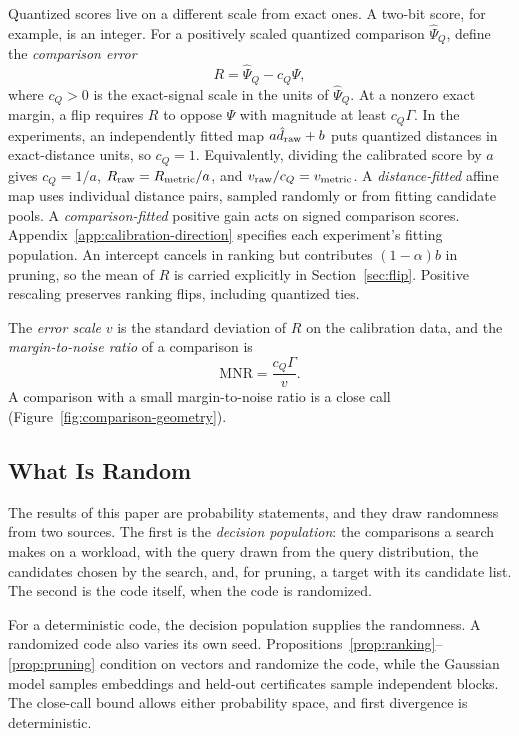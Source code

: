 \documentclass[twoside,11pt]{article}
\newcommand{\mnr}{\mathrm{MNR}}
\begin{document}
Quantized scores live on a different scale from exact ones. A two-bit score, for example, is an integer. For a positively scaled quantized comparison $\widehat\Psi_Q$, define the \emph{comparison error}
\begin{equation}
R=\widehat\Psi_Q-c_Q\Psi,
\label{eq:comparison-error}
\end{equation}
where $c_Q>0$ is the exact-signal scale in the units of $\widehat\Psi_Q$. At a nonzero exact margin, a flip requires $R$ to oppose $\Psi$ with magnitude at least $c_Q\Gamma$. In the experiments, an independently fitted map $a\hat d_{\rm raw}+b$ puts quantized distances in exact-distance units, so $c_Q=1$. Equivalently, dividing the calibrated score by $a$ gives $c_Q=1/a$, $R_{\rm raw}=R_{\rm metric}/a$, and $v_{\rm raw}/c_Q=v_{\rm metric}$. A \emph{distance-fitted} affine map uses individual distance pairs, sampled randomly or from fitting candidate pools. A \emph{comparison-fitted} positive gain acts on signed comparison scores. Appendix~\ref{app:calibration-direction} specifies each experiment's fitting population. An intercept cancels in ranking but contributes $(1-\alpha)b$ in pruning, so the mean of $R$ is carried explicitly in Section~\ref{sec:flip}. Positive rescaling preserves ranking flips, including quantized ties.

The \emph{error scale} $v$ is the standard deviation of $R$ on the calibration data, and the \emph{margin-to-noise ratio} of a comparison is
\begin{equation}
\mnr=\frac{c_Q\Gamma}{v}.
\end{equation}
A comparison with a small margin-to-noise ratio is a close call (Figure~\ref{fig:comparison-geometry}).

\subsection{What Is Random}
\label{sec:randomness}

The results of this paper are probability statements, and they draw randomness from two sources. The first is the \emph{decision population}: the comparisons a search makes on a workload, with the query drawn from the query distribution, the candidates chosen by the search, and, for pruning, a target with its candidate list. The second is the code itself, when the code is randomized.

For a deterministic code, the decision population supplies the randomness. A randomized code also varies its own seed. Propositions~\ref{prop:ranking}--\ref{prop:pruning} condition on vectors and randomize the code, while the Gaussian model samples embeddings and held-out certificates sample independent blocks. The close-call bound allows either probability space, and first divergence is deterministic.
\end{document}
